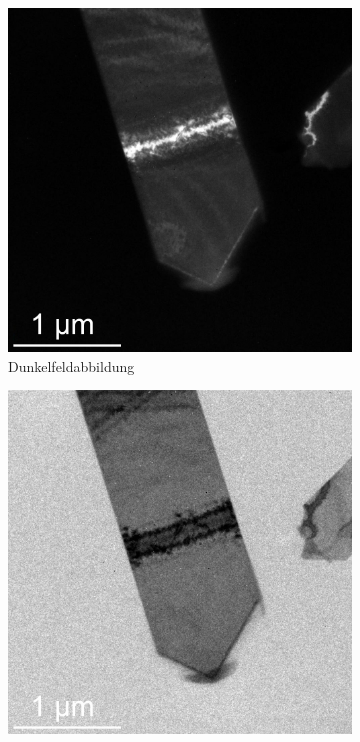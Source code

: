 \documentclass[slug=TEM, room=IFW, supervisor=?, coursedate=23.\ 01.\ 2020]{../../Lab_Report_LaTeX/lab_report}
\begin{document}
\begin{figure}[htp]
  \centering
  \begin{subfigure}{.3\textwidth}
    \includegraphics[width=\textwidth]{../messungen/molybdaen/auswertung/mol_mit_BLENDE_dunkelfeld_m.jpg}
    \caption{Dunkelfeldabbildung}%
    \label{fig:molpicts_df}
  \end{subfigure}
  \begin{subfigure}{.3\textwidth}
    \includegraphics[width=\textwidth]{../messungen/molybdaen/auswertung/mol_mit_BLENDE_m.jpg}

\end{subfigure}
\end{figure}
\end{document}
